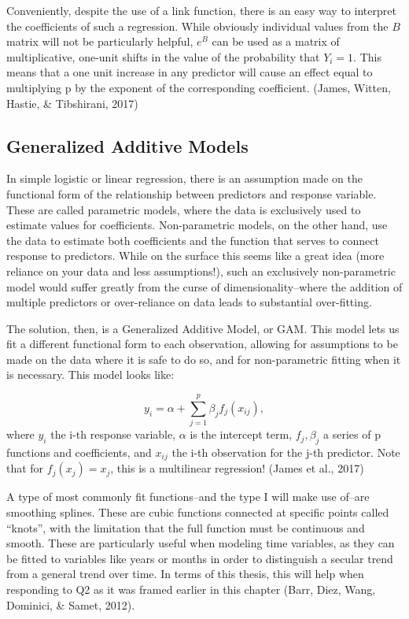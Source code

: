 \documentclass[12pt,twoside]{reedthesis}
\begin{document}
  Conveniently, despite the use of a link function, there is an easy way
  to interpret the coefficients of such a regression. While obviously
  individual values from the \(B\) matrix will not be particularly
  helpful, \(e^B\) can be used as a matrix of multiplicative, one-unit
  shifts in the value of the probability that \(Y_i = 1\). This means that
  a one unit increase in any predictor will cause an effect equal to
  multiplying p by the exponent of the corresponding coefficient. (James,
  Witten, Hastie, \& Tibshirani, 2017)
  
  \subsection{Generalized Additive
  Models}\label{generalized-additive-models}
  
  In simple logistic or linear regression, there is an assumption made on
  the functional form of the relationship between predictors and response
  variable. These are called parametric models, where the data is
  exclusively used to estimate values for coefficients. Non-parametric
  models, on the other hand, use the data to estimate both coefficients
  and the function that serves to connect response to predictors. While on
  the surface this seems like a great idea (more reliance on your data and
  less assumptions!), such an exclusively non-parametric model would
  suffer greatly from the curse of dimensionality--where the addition of
  multiple predictors or over-reliance on data leads to substantial
  over-fitting.
  
  The solution, then, is a Generalized Additive Model, or GAM. This model
  lets us fit a different functional form to each observation, allowing
  for assumptions to be made on the data where it is safe to do so, and
  for non-parametric fitting when it is necessary. This model looks like:
  
  \[y_i = \alpha + \sum_{j = 1}^p \beta_j f_j(x_{ij}),\] where \(y_i\) the
  i-th response variable, \(\alpha\) is the intercept term,
  \(f_j, \beta_j\) a series of p functions and coefficients, and
  \(x_{ij}\) the i-th observation for the j-th predictor. Note that for
  \(f_j(x_j) = x_j\), this is a multilinear regression! (James et al.,
  2017)
  
  A type of most commonly fit functions--and the type I will make use
  of--are smoothing splines. These are cubic functions connected at
  specific points called ``knots'', with the limitation that the full
  function must be continuous and smooth. These are particularly useful
  when modeling time variables, as they can be fitted to variables like
  years or months in order to distinguish a secular trend from a general
  trend over time. In terms of this thesis, this will help when responding
  to Q2 as it was framed earlier in this chapter (Barr, Diez, Wang,
  Dominici, \& Samet, 2012).
  
\end{document}
